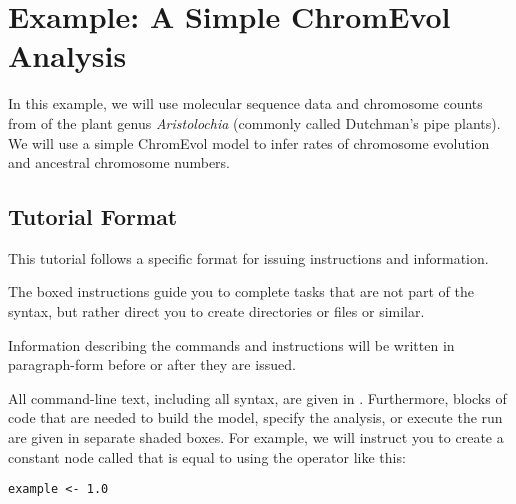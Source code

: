 
\begin{figure}[h!]
\label{fig:chromevol_simple}
\end{figure}

\section{Example: A Simple ChromEvol Analysis}\label{sec:chromo_basic_analysis}

In this example, we will use molecular sequence data and chromosome counts from \citet{ohi2006molecular} of the plant genus \textit{Aristolochia} (commonly called Dutchman's pipe plants). 
We will use a simple ChromEvol model to infer rates of chromosome evolution and ancestral chromosome numbers.

\medskip
\subsection{Tutorial Format}\label{subsect:Exercise-Format}

This tutorial follows a specific format for issuing instructions and information.

{\begin{framed}
The boxed instructions guide you to complete tasks that are not part of the \RevBayes syntax, but rather direct you to create directories or files or similar.
\end{framed}}


Information describing the commands and instructions will be written in paragraph-form before or after they are issued.

All command-line text, including all \Rev syntax, are given in . 
Furthermore, blocks of \Rev code that are needed to build the model, specify the analysis, or execute the run are given in separate shaded boxes.
For example, we will instruct you to create a constant node called  that is equal to  using the \cl{<-} operator like this:
{\tt \begin{snugshade*}
\begin{lstlisting}
example <- 1.0
\end{lstlisting}
\end{snugshade*}
}

